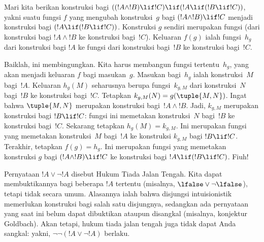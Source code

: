 \documentclass[../../../include/open-logic-section]{subfiles}
\begin{document}
\begin{ex}
Mari kita berikan konstruksi bagi $((!A \land !B) \lif !C) \lif (!A \lif
(!B \lif !C))$, yakni suatu fungsi $f$ yang mengubah konstruksi~$g$ bagi
$(!A \land !B) \lif !C$ menjadi konstruksi bagi $(!A \lif (!B \lif !C))$.
Konstruksi $g$ sendiri merupakan fungsi (dari konstruksi bagi $!A \land !B$
ke konstruksi bagi~$!C$). Keluaran $f(g)$ ialah fungsi~$h_g$ dari konstruksi
bagi $!A$ ke fungsi dari konstruksi bagi~$!B$ ke konstruksi bagi~$!C$.

Baiklah, ini membingungkan. Kita harus membangun fungsi tertentu~$h_g$, yang
akan menjadi keluaran $f$ bagi masukan~$g$. Masukan bagi~$h_g$ ialah
konstruksi~$M$ bagi~$!A$. Keluaran $h_g(M)$ seharusnya berupa fungsi~$k_{g,M}$
dari konstruksi~$N$ bagi~$!B$ ke konstruksi bagi~$!C$. Tetapkan
$k_{g,M}(N) = g(\tuple{M, N})$. Ingat bahwa $\tuple{M, N}$ merupakan
konstruksi bagi~$!A \land !B$. Jadi, $k_{g,M}$ merupakan konstruksi bagi $!B
\lif !C$: fungsi ini memetakan konstruksi~$N$ bagi~$!B$ ke konstruksi
bagi~$!C$. Sekarang tetapkan $h_g(M) = k_{g,M}$. Ini merupakan fungsi yang
memetakan konstruksi~$M$ bagi~$!A$ ke konstruksi $k_{g,M}$ bagi $!B \lif !C$.
Terakhir, tetapkan $f(g) = h_g$. Ini merupakan fungsi yang memetakan
konstruksi $g$ bagi $(!A \land !B) \lif !C$ ke konstruksi bagi $!A \lif (!B
\lif !C)$. Fiuh!{}
\end{ex}

Pernyataan $!A \lor \lnot !A$ disebut Hukum Tiada Jalan Tengah. Kita dapat
membuktikannya bagi beberapa $!A$ tertentu (misalnya, $\lfalse \lor \lnot
\lfalse$), tetapi tidak secara umum. Alasannya ialah bahwa disjungsi
intuisionistik memerlukan konstruksi bagi salah satu disjungnya, sedangkan ada
pernyataan yang saat ini belum dapat dibuktikan ataupun disangkal (misalnya,
konjektur Goldbach). Akan tetapi, hukum tiada jalan tengah juga tidak dapat
Anda sangkal: yakni, $\lnot \lnot (!A \lor \lnot !A)$ berlaku.
\end{document}
